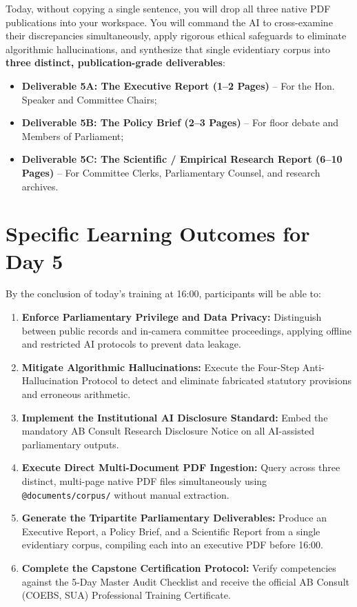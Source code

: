 \documentclass[11pt, a4paper]{report}
\begin{document}
Today, without copying a single sentence, you will drop all three native PDF publications into your workspace. You will command the AI to cross-examine their discrepancies simultaneously, apply rigorous ethical safeguards to eliminate algorithmic hallucinations, and synthesize that single evidentiary corpus into \textcolor{suagreen}{\textbf{three distinct, publication-grade deliverables}}:
\begin{itemize}[label=-]
    \item \textbf{Deliverable 5A: The Executive Report (1--2 Pages)} -- For the Hon. Speaker and Committee Chairs;
    \item \textbf{Deliverable 5B: The Policy Brief (2--3 Pages)} -- For floor debate and Members of Parliament;
    \item \textbf{Deliverable 5C: The Scientific / Empirical Research Report (6--10 Pages)} -- For Committee Clerks, Parliamentary Counsel, and research archives.
\end{itemize}

\section{Specific Learning Outcomes for Day 5}
By the conclusion of today's training at 16:00, participants will be able to:
\begin{enumerate}[label=\textbf{5.\arabic*}]
    \item \textbf{Enforce Parliamentary Privilege and Data Privacy:} Distinguish between public records and in-camera committee proceedings, applying offline and restricted AI protocols to prevent data leakage.
    \item \textbf{Mitigate Algorithmic Hallucinations:} Execute the Four-Step Anti-Hallucination Protocol to detect and eliminate fabricated statutory provisions and erroneous arithmetic.
    \item \textbf{Implement the Institutional AI Disclosure Standard:} Embed the mandatory AB Consult Research Disclosure Notice on all AI-assisted parliamentary outputs.
    \item \textbf{Execute Direct Multi-Document PDF Ingestion:} Query across three distinct, multi-page native PDF files simultaneously using \texttt{@documents/corpus/} without manual extraction.
    \item \textbf{Generate the Tripartite Parliamentary Deliverables:} Produce an Executive Report, a Policy Brief, and a Scientific Report from a single evidentiary corpus, compiling each into an executive PDF before 16:00.
    \item \textbf{Complete the Capstone Certification Protocol:} Verify competencies against the 5-Day Master Audit Checklist and receive the official AB Consult (COEBS, SUA) Professional Training Certificate.
\end{enumerate}
\end{document}
